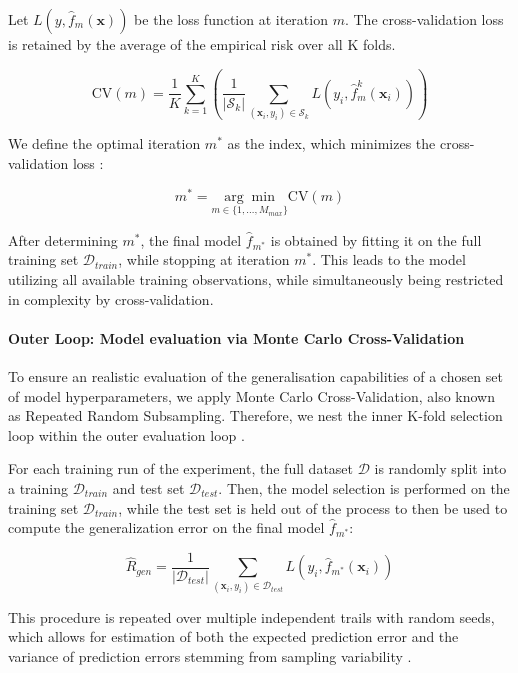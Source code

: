 \documentclass[fontsize=12 pt]{scrartcl}
\begin{document}
Let $L(y, \hat{f}_m(\mathbf{x}))$ be the loss function at iteration $m$. The cross-validation loss is retained by the average of the empirical risk over all K folds.

\begin{equation}
    \text{CV}(m) = \frac{1}{K} \sum_{k=1}^K \left( \frac{1}{|\mathcal{S}_k|} \sum_{(\mathbf{x}_i, y_i) \in \mathcal{S}_k} L(y_i, \hat{f}^{k}_m(\mathbf{x}_i)) \right)
\end{equation}

We define the optimal iteration $m^*$ as the index, which minimizes the cross-validation loss \citep{hastie2009elements}:

\begin{equation}
    m^* = \underset{m \in \{1, \dots, M_{max}\}}{\arg \min} \text{CV}(m)
\end{equation}

After determining $m^*$, the final model $\hat{f}_{m^*}$ is obtained by fitting it on the full training set $\mathcal{D}_{train}$, while stopping at iteration $m^*$. This leads to the model utilizing all available training observations, while simultaneously being restricted in complexity by cross-validation.

\paragraph{Outer Loop: Model evaluation via Monte Carlo Cross-Validation}

To ensure an realistic evaluation of the generalisation capabilities of a chosen set of model hyperparameters, we apply Monte Carlo Cross-Validation, also known as Repeated Random Subsampling. Therefore, we nest the inner K-fold selection loop within the outer evaluation loop \citep{arlot2010survey}.

For each training run of the experiment, the full dataset $\mathcal{D}$ is randomly split into a training $\mathcal{D}_{train}$ and test set $\mathcal{D}_{test}$. Then, the model selection is performed on the training set $\mathcal{D}_{train}$, while the test set is held out of the process to then be used to compute the generalization error on the final model $\hat{f}_{m^*}$:

\begin{equation}
    \hat{R}_{gen} = \frac{1}{|\mathcal{D}_{test}|} \sum_{(\mathbf{x}_i, y_i) \in \mathcal{D}_{test}} L(y_i, \hat{f}_{m^*}(\mathbf{x}_i))
\end{equation}

This procedure is repeated over multiple independent trails with random seeds, which allows for estimation of both the expected prediction error and the variance of prediction errors stemming from sampling variability \citep{dietterich1998approximate}.
\end{document}
